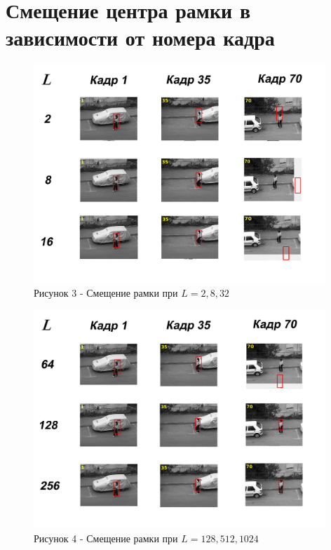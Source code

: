 \documentclass[14pt, a4paper]{article}
\begin{document}
\newpage

\section*{Смещение центра рамки в зависимости от номера кадра}

 \begin{figure}[h!]
    \centering
    \includegraphics[width=11cm]{tests/img/Bez_imeni-1.jpg}
    \caption*{Рисунок 3 - Смещение рамки при $L = 2,8,32$}
\end{figure}

 \begin{figure}[h!]
    \centering
    \includegraphics[width=11cm]{tests/img/Bez_imeni-2.jpg}
    \caption*{Рисунок 4 - Смещение рамки при $L = 128,512,1024$}
\end{figure}




\end{document}

